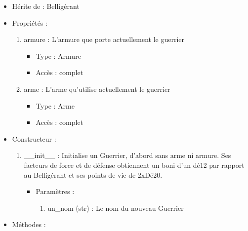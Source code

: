 \documentclass[12pt,pdftex,oneside]{article}
\begin{document}
  \begin{itemize}
  \item Hérite de : Belligérant
  \item Propriétés : 
    \begin{enumerate}
    \item armure : L'armure que porte actuellement le guerrier
          \begin{itemize}
          \item Type : Armure
          \item Accès : complet
          \end{itemize}
    \item arme : L'arme qu'utilise actuellement le guerrier
          \begin{itemize}
          \item Type : Arme
          \item Accès : complet
          \end{itemize}

    \end{enumerate}

  \item Constructeur : 

  \begin{enumerate}
  \item \_\_init\_\_ : Initialise un Guerrier, d'abord sans arme ni armure. Ses
    facteurs de force et de défense obtiennent un boni d'un dé12 par rapport au
    Belligérant et ses points de vie de 2xDé20.
    \begin{itemize}
    \item Paramètres : 
      \begin{enumerate}
      \item un\_nom (str) : Le nom du nouveau Guerrier
      \end{enumerate}
    \end{itemize}

  \end{enumerate}

  \item Méthodes : 


\end{itemize}
\end{document}
